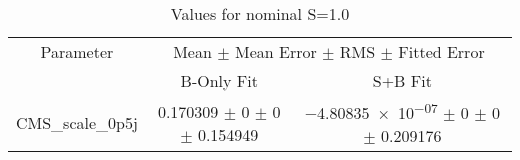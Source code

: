 \begin{table}
\centering
\caption{Values for nominal S=1.0}
\begin{tabular}{ccc}
\toprule
Parameter 	& \multicolumn{2}{c}{Mean $\pm$ Mean Error $\pm$ RMS $\pm$ Fitted Error}\\
 	& B-Only Fit & S+B Fit\\
\midrule
CMS\_scale\_0p5j 	& \num{0.170309} $\pm$ \num{0} $\pm$ \num{0} $\pm$ \num{0.154949} 	& \num{-4.80835e-07} $\pm$ \num{0} $\pm$ \num{0} $\pm$ \num{0.209176}\\
\bottomrule
\end{tabular}
\end{table}